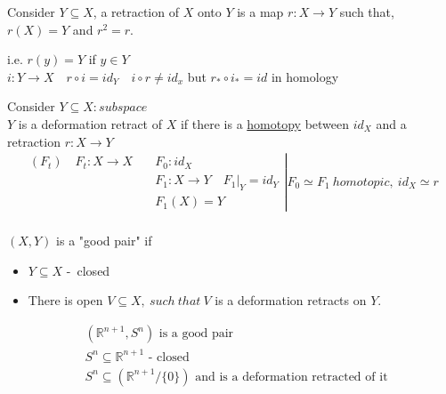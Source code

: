 \documentclass[11pt,a4paper]{report}
\begin{document}
               
                \begin{defn}[Retraction] 
                  Consider $Y \subseteq X $, a retraction of $X$ onto $Y$ is a map $r: X \rightarrow Y$ such that, $ r(X) = Y$ and $r^2 = r$.\\
                \end{defn}
                  i.e. $r(y) = Y$ if $y \in Y$\\
                  $i: Y \rightarrow X \quad r \circ i = id_Y \quad i \circ r \ne id_x$ 
                  but $r_* \circ i_* = id$ in homology\\

                \begin{defn} 
                  Consider $Y \subseteq X: subspace$\\
                  $Y$ is a deformation retract of $X$ if there is a \underline{homotopy} between $id_X$ and a retraction $r: X \rightarrow Y$\\
                  \begin{align*}
                    \left.
                    \begin{array}{cl}
                      (F_t) \quad F_t: X \rightarrow X \quad &F_0: id_X\\
                                           &F_1: X \rightarrow Y \quad F_1|_Y = id_Y\\
                                           &F_1(X) = Y
                    \end{array}
                                             \right| F_0 \simeq F_1\ homotopic,\ id_X \simeq r\\
                  \end{align*}
                \end{defn}
                $(X, Y)$ is a "good pair" if
                \begin{itemize}
                \item $Y \subseteq X$ -\ closed
                \item There is open $V \subseteq X,\ such \ that \ V$ is a deformation retracts on $Y$.
                \end{itemize}

                \begin{Ex}
                \begin{align*}
                  &(\mathbb{R}^{n+1}, S^n) \textrm{ is a good pair}\\
                  &S^n \subseteq \mathbb{R}^{n+1} \textrm{ - closed}\\
                  &S^n \subseteq (\mathbb{R}^{n+1} / \{0\}) \textrm{ and is a deformation retracted of it}
                \end{align*}
                \end{Ex}
\end{document}
